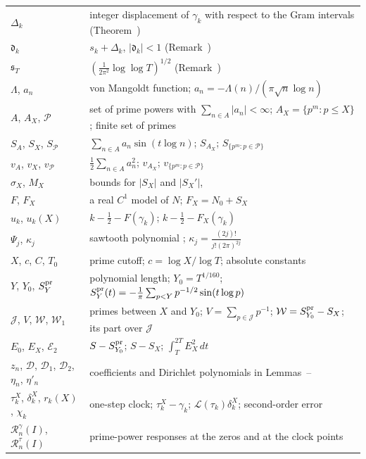 \documentclass[preprint,12pt]{elsarticle}
\makeatletter
\let\CG@origref\ref
\let\CG@origeqref\eqref
\newcommand{\CG@gettip}[1]{\@ifundefined{CGTip@#1}{Reference: #1}{\csname CGTip@#1\endcsname}}
\DeclareRobustCommand{\CGref}[1]{\pdftooltip{\CG@origref{#1}}{\CG@gettip{#1}}}
\DeclareRobustCommand{\CGeqref}[1]{\pdftooltip{\CG@origeqref{#1}}{\CG@gettip{#1}}}
\numberwithin{equation}{section}
\theoremstyle{plain}
\theoremstyle{definition}
\theoremstyle{remark}
\newcommand{\NO}{N_0}
\newcommand{\lL}{\mathcal L}
\newcommand{\Rg}{\mathcal R^{\gamma}}
\newcommand{\Rt}{\mathcal R^{\tau}}
\newcommand{\PP}{\mathcal P}
\makeatother
\begin{document}
\begin{center}
\begin{longtable}{p{}p{}}
$\Delta_k$ & integer displacement of $\gamma_k$ with respect to the Gram intervals (Theorem~\CGref{thm:known_korolev})\\
$\mathfrak d_k$ & $s_k+\Delta_k$, $|\mathfrak d_k|<1$ (Remark~\CGref{rem:korolev})\\
$\mathfrak s_T$ & $(\frac1{2\pi^2}\log\log T)^{1/2}$ (Remark~\CGref{rem:korolev})\\
$\Lambda$, $a_n$ & von Mangoldt function; $a_n=-\Lambda(n)/(\pi\sqrt n\log n)$\\
$A$, $A_X$, $\PP$ & set of prime powers with $\sum_{n\in A}|a_n|<\infty$; $A_X=\{p^m:p\le X\}$; finite set of primes\\
$S_A$, $S_X$, $S_\PP$ & $\sum_{n\in A}a_n\sin(t\log n)$; $S_{A_X}$; $S_{\{p^m:p\in\PP\}}$\\
$v_A$, $v_X$, $v_\PP$ & $\frac12\sum_{n\in A}a_n^2$; $v_{A_X}$; $v_{\{p^m:p\in\PP\}}$\\
$\sigma_X$, $M_X$ & bounds for $|S_X|$ and $|S_X'|$, \CGeqref{eq:sigma_M_def}\\
$F$, $F_X$ & a real $C^1$ model of $N$; $F_X=\NO+S_X$\\
$u_k$, $u_k(X)$ & $k-\frac12-F(\gamma_k)$; $k-\frac12-F_X(\gamma_k)$\\
$\Psi_j$, $\kappa_j$ & sawtooth polynomial \CGeqref{eq:Psi_def}; $\kappa_j=\frac{(2j)!}{j!(2\pi)^{2j}}$\\
$X$, $c$, $C$, $T_0$ & prime cutoff; $c=\log X/\log T$; absolute constants\\
$Y$, $Y_0$, $S^{\rm pr}_Y$ & polynomial length; $Y_0=T^{1/160}$; $S^{\rm pr}_Y(t)=-\frac1\pi\sum_{p<Y}p^{-1/2}\sin(t\log p)$\\
$\mathcal J$, $V$, $\mathcal W$, $\mathcal W_1$ & primes between $X$ and $Y_0$; $V=\sum_{p\in\mathcal J}p^{-1}$; $\mathcal W=S^{\rm pr}_{Y_0}-S_X$; its part over $\mathcal J$ \CGeqref{eq:D_def}\\
$E_0$, $E_X$, $\mathcal E_2$ & $S-S^{\rm pr}_{Y_0}$; $S-S_X$; $\int_T^{2T}E_X^2\,dt$\\
$z_n$, $\mathcal D$, $\mathcal D_1$, $\mathcal D_2$, $\eta_n$, $\eta'_n$ & coefficients and Dirichlet polynomials in Lemmas~\CGref{lem:trig_MV}--\CGref{lem:D_moments}\\
$\tau_k^X$, $\delta_k^X$, $r_k(X)$, $\chi_k$ & one-step clock; $\tau_k^X-\gamma_k$; $\lL(\tau_k)\delta_k^X$; second-order error \CGeqref{eq:one_step_decomposition}\\
$\Rg_n(I)$, $\Rt_n(I)$ & prime-power responses at the zeros and at the clock points \CGeqref{eq:two_responses}\\

\end{longtable}
\end{center}
\end{document}
